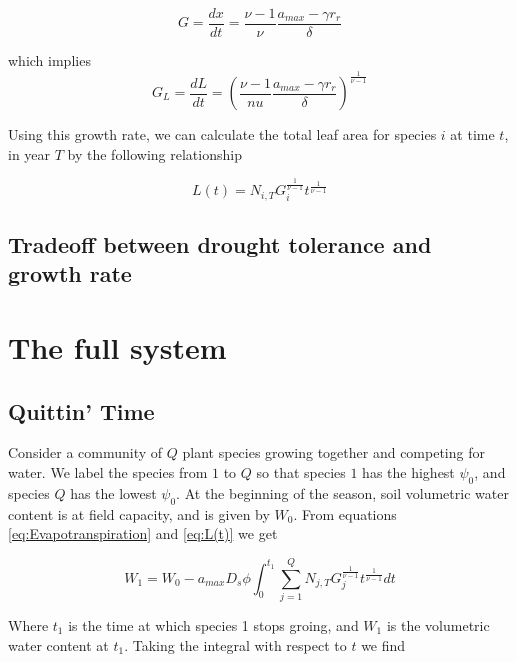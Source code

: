 \documentclass{article}
\begin{document}
  \begin{equation} \label{eq:Gx}
    G = \frac{dx}{dt} = \frac{\nu - 1}{\nu}\frac{a_{max} - \gamma r_{r}}{\delta}
  \end{equation}

  which implies
  \begin{equation} \label{eq:Gl}
    G_{L} = \frac{dL}{dt} = \left( \frac{\nu - 1}{nu} \frac{a_{max} - \gamma r_{r}}{\delta} \right)^{\frac{1}{\nu - 1}}
  \end{equation}

  Using this growth rate, we can calculate the total leaf area for species $i$ at
  time $t$, in year $T$ by the following relationship

  \begin{equation} \label{eq:L(t)}
    L(t) = N_{i, T}G_{i}^{\frac{1}{\nu - 1}}t^{\frac{1}{\nu - 1}}
  \end{equation}

  \subsection{Tradeoff between drought tolerance and growth rate} \label{G tradeoffs}




  \section{The full system}

  \subsection{Quittin' Time}

  Consider a community of $Q$ plant species growing together and competing for
  water. We label the species from $1$ to $Q$ so that species $1$ has the
  highest $\psi_{0}$, and species $Q$ has the lowest $\psi_{0}$. At the
  beginning of the season, soil volumetric water content is at field capacity,
  and is given by $W_{0}$. From equations \ref{eq:Evapotranspiration} and
  \ref{eq:L(t)} we get

  $$ W_{1} =  W_{0} - a_{max}D_{s}\phi \int_{0}^{t_{1}} \! \sum_{j = 1}^{Q}N_{j, T}G_{j}^{\frac{1}{\nu-1}}t^{\frac{1}{\nu-1}}dt$$

 Where $t_{1}$ is the time at which species 1 stops groing, and $W_{1}$ is the
 volumetric water content at $t_{1}$. Taking the integral with respect to $t$ we find
\end{document}
